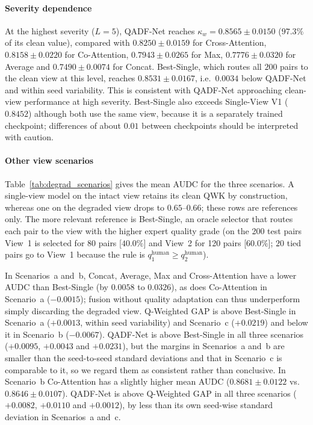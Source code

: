 \documentclass[final,5p,times,twocolumn,authoryear]{elsarticle}
\newcommand{\qadfnet}{QADF-Net}
\theoremstyle{plain}
\theoremstyle{remark}
\begin{document}
\paragraph{Severity dependence} At the highest severity ($L=5$), \qadfnet{} reaches $\kappa_w=0.8565\pm0.0150$ ($97.3\%$ of its clean value), compared with $0.8250\pm0.0159$ for Cross-Attention, $0.8158\pm0.0220$ for Co-Attention, $0.7943\pm0.0265$ for Max, $0.7776\pm0.0320$ for Average and $0.7490\pm0.0074$ for Concat. Best-Single, which routes all $200$ pairs to the clean view at this level, reaches $0.8531\pm0.0167$, i.e.\ $0.0034$ below \qadfnet{} and within seed variability. This is consistent with \qadfnet{} approaching clean-view performance at high severity. Best-Single also exceeds Single-View V1 ($0.8452$) although both use the same view, because it is a separately trained checkpoint; differences of about $0.01$ between checkpoints should be interpreted with caution.


\paragraph{Other view scenarios} Table~\ref{tab:degrad_scenarios} gives the mean AUDC for the three scenarios. A single-view model on the intact view retains its clean QWK by construction, whereas one on the degraded view drops to $0.65$--$0.66$; these rows are references only. The more relevant reference is Best-Single, an oracle selector that routes each pair to the view with the higher expert quality grade (on the 200 test pairs View~1 is selected for 80 pairs [$40.0\%$] and View~2 for 120 pairs [$60.0\%$]; $20$ tied pairs go to View~1 because the rule is $q_1^{\text{human}} \ge q_2^{\text{human}}$).

In Scenarios~a and~b, Concat, Average, Max and Cross-Attention have a lower AUDC than Best-Single (by $0.0058$ to $0.0326$), as does Co-Attention in Scenario~a ($-0.0015$); fusion without quality adaptation can thus underperform simply discarding the degraded view. Q-Weighted GAP is above Best-Single in Scenario~a ($+0.0013$, within seed variability) and Scenario~c ($+0.0219$) and below it in Scenario~b ($-0.0067$). \qadfnet{} is above Best-Single in all three scenarios ($+0.0095$, $+0.0043$ and $+0.0231$), but the margins in Scenarios~a and~b are smaller than the seed-to-seed standard deviations and that in Scenario~c is comparable to it, so we regard them as consistent rather than conclusive. In Scenario~b Co-Attention has a slightly higher mean AUDC ($0.8681\pm0.0122$ vs.\ $0.8646\pm0.0107$). \qadfnet{} is above Q-Weighted GAP in all three scenarios ($+0.0082$, $+0.0110$ and $+0.0012$), by less than its own seed-wise standard deviation in Scenarios~a and~c.
\end{document}
